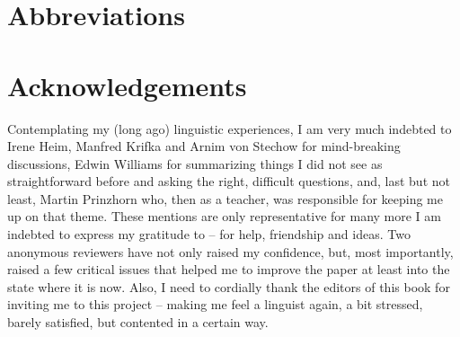 \documentclass[output=paper,colorlinks,citecolor=brown,
]{langscibook}
\begin{document}
\section*{Abbreviations}

\section*{Acknowledgements}

Contemplating my (long ago) linguistic experiences, I am
very much indebted to Irene Heim, Manfred Krifka and Arnim von Stechow for mind-breaking discussions,
Edwin Williams for summarizing things I did not see as straightforward before and asking the right, difficult
questions, and, last but not least, Martin Prinzhorn who, then as a teacher, was responsible for keeping me up on that
theme. These mentions are only representative for many more I am indebted to express my gratitude to -- for help,
friendship and ideas. Two anonymous reviewers have not only raised my confidence, but, most importantly, raised a few
critical issues that helped me to improve the paper at least into the state where it is now. Also, I need to cordially thank the
editors of this book for inviting me to this project -- making
me feel a linguist again, a bit stressed, barely satisfied, but contented in a certain way.




\printbibliography[heading=subbibliography,notkeyword=this]
\end{document}
